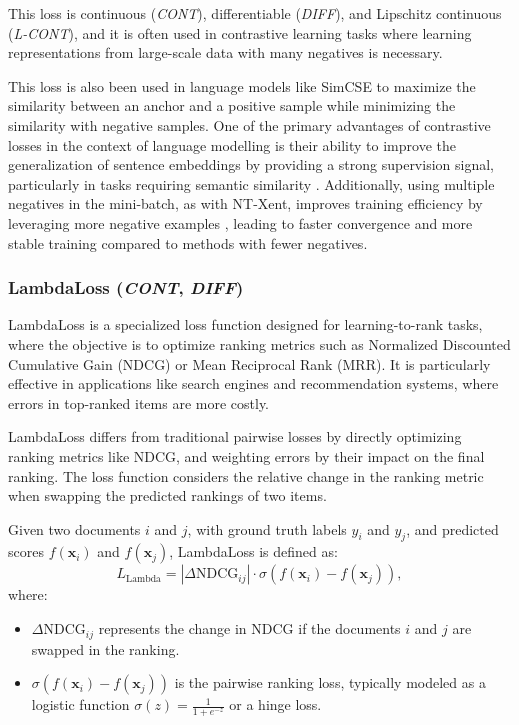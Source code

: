\documentclass[sn-mathphys-num]{sn-jnl}%
\newcommand \cont{\textit{CONT}}
\newcommand \lcont{\textit{L-CONT}}
\newcommand \diff{\textit{DIFF}}
\begin{document}
This loss is continuous (\cont), differentiable (\diff), and Lipschitz continuous (\lcont), and it is often used in contrastive learning tasks where learning representations from large-scale data with many negatives is necessary.

This loss is also been used in language models like SimCSE \cite{gao2021simcse} to maximize the similarity between an anchor and a positive sample while minimizing the similarity with negative samples. 
One of the primary advantages of contrastive losses in the context of language modelling is their ability to improve the generalization of sentence embeddings by providing a strong supervision signal, particularly in tasks requiring semantic similarity \cite{gao2021simcse}. Additionally, using multiple negatives in the mini-batch, as with NT-Xent, improves training efficiency by leveraging more negative examples \cite{reimers2019sentence}, leading to faster convergence and more stable training compared to methods with fewer negatives.


\subsubsection{LambdaLoss (\cont, \diff)}\label{subsubsec-ranking_lambda_loss}
LambdaLoss \cite{burges2010ranknet,burges2006learning} is a specialized loss function designed for learning-to-rank tasks, where the objective is to optimize ranking metrics such as Normalized Discounted Cumulative Gain (NDCG) or Mean Reciprocal Rank (MRR). It is particularly effective in applications like search engines and recommendation systems, where errors in top-ranked items are more costly.

LambdaLoss differs from traditional pairwise losses by directly optimizing ranking metrics like NDCG, and weighting errors by their impact on the final ranking. The loss function considers the relative change in the ranking metric when swapping the predicted rankings of two items.

Given two documents \( i \) and \( j \), with ground truth labels \( y_i \) and \( y_j \), and predicted scores \( f(\mathbf{x}_i) \) and \( f(\mathbf{x}_j) \), LambdaLoss is defined as:
\begin{equation}
    L_{\text{Lambda}} = |\Delta \text{NDCG}_{ij}| \cdot \sigma(f(\mathbf{x}_i) - f(\mathbf{x}_j)),
\end{equation}
where:
\begin{itemize}
    \item \( \Delta \text{NDCG}_{ij} \) represents the change in NDCG if the documents \( i \) and \( j \) are swapped in the ranking.
    \item \( \sigma(f(\mathbf{x}_i) - f(\mathbf{x}_j)) \) is the pairwise ranking loss, typically modeled as a logistic function \( \sigma(z) = \frac{1}{1 + e^{-z}} \) or a hinge loss.
\end{itemize}
\end{document}
